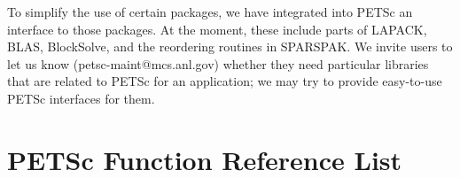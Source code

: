 To simplify the use of certain packages, we have integrated
into PETSc an interface to those packages. At the moment, these include
parts of LAPACK, BLAS, BlockSolve, and the reordering routines in 
SPARSPAK.  We invite users to 
 let us know (petsc-maint@mcs.anl.gov) 
whether they  need particular libraries that 
are related to PETSc for an application; we may try to provide 
easy-to-use PETSc interfaces for them. 

\appendix

\chapter{PETSc Function Reference List}



\vfill
\eject









